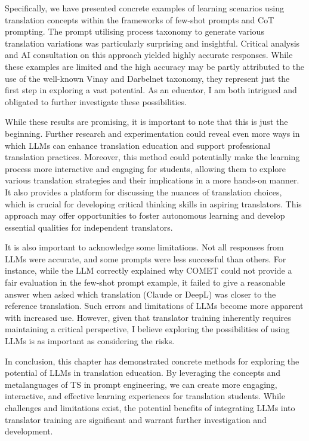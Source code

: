 \documentclass[output=paper,colorlinks,citecolor=brown, japanesefont]{langscibook}
\begin{document}
Specifically, we have presented concrete examples of learning scenarios using translation concepts within the frameworks of few-shot prompts and CoT prompting. The prompt utilising process taxonomy to generate various translation variations was particularly surprising and insightful. Critical analysis and AI consultation on this approach yielded highly accurate responses. While these examples are limited and the high accuracy may be partly attributed to the use of the well-known Vinay and Darbelnet taxonomy, they represent just the first step in exploring a vast potential. As an educator, I am both intrigued and obligated to further investigate these possibilities.

While these results are promising, it is important to note that this is just the beginning. Further research and experimentation could reveal even more ways in which LLMs can enhance translation education and support professional translation practices. Moreover, this method could potentially make the learning process more interactive and engaging for students, allowing them to explore various translation strategies and their implications in a more hands-on manner. It also provides a platform for discussing the nuances of translation choices, which is crucial for developing critical thinking skills in aspiring translators. This approach may offer opportunities to foster autonomous learning and develop essential qualities for independent translators.

It is also important to acknowledge some limitations. Not all responses from LLMs were accurate, and some prompts were less successful than others. For instance, while the LLM correctly explained why COMET could not provide a fair evaluation in the few-shot prompt example, it failed to give a reasonable answer when asked which translation (Claude or DeepL) was closer to the reference translation. Such errors and limitations of LLMs become more apparent with increased use. However, given that translator training inherently requires maintaining a critical perspective, I believe exploring the possibilities of using LLMs is as important as considering the risks.

In conclusion, this chapter has demonstrated concrete methods for exploring the potential of LLMs in translation education. By leveraging the concepts and metalanguages of TS in prompt engineering, we can create more engaging, interactive, and effective learning experiences for translation students. While challenges and limitations exist, the potential benefits of integrating LLMs into translator training are significant and warrant further investigation and development.
\end{document}

